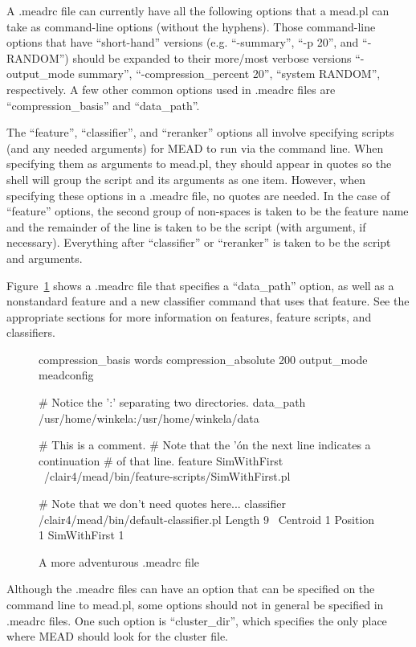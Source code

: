 \documentclass[10pt]{article}
\begin{document}
A .meadrc file can currently have all the following options that
a mead.pl can take as command-line options (without the hyphens).  
Those command-line options that have ``short-hand'' versions
(e.g. ``-summary'', ``-p 20'', and ``-RANDOM'') should be expanded to 
their more/most verbose versions ``-output\_mode summary'', 
``-compression\_percent 20'', ``system RANDOM'', respectively.
A few other common options used in .meadrc files are ``compression\_basis''
and ``data\_path''.

The ``feature'', ``classifier'', and ``reranker'' options all 
involve specifying scripts (and any needed arguments) for MEAD to
run via the command line.  When specifying them as arguments
to mead.pl, they should appear in quotes so the shell will group
the script and its arguments as one item.  However, when
specifying these options in a .meadrc file, no quotes are needed.
In the case of  ``feature'' options, the second group of
non-spaces is taken to be the feature name and the remainder of the
line is taken to be the script (with argument, if necessary).
Everything after ``classifier'' or ``reranker'' is taken to be
the script and arguments.

Figure~\ref{figure:meadrc2} shows a .meadrc file that specifies a
``data\_path'' option, as well as a nonstandard feature and a 
new classifier command that uses that feature.  See the
appropriate sections for more information on features, feature
scripts, and classifiers.  

\begin{figure}[htp!]
\centering
\begin{boxedverbatim}
compression_basis       words
compression_absolute    200
output_mode             meadconfig

# Notice the ':' separating two directories.
data_path               /usr/home/winkela:/usr/home/winkela/data

# This is a comment.
# Note that the '\' on the next line indicates a continuation
# of that line.
feature SimWithFirst \
   /clair4/mead/bin/feature-scripts/SimWithFirst.pl

# Note that we don't need quotes here...
classifier /clair4/mead/bin/default-classifier.pl Length 9 \
   Centroid 1 Position 1 SimWithFirst 1
\end{boxedverbatim}
\caption{A more adventurous .meadrc file}
\label{figure:meadrc2}
\end{figure}

Although the .meadrc files can have an option that can be specified
on the command line to mead.pl, some options should not in general
be specified in .meadrc files.  One such option is
``cluster\_dir'', which specifies the only place where MEAD
should look for the cluster file.
\end{document}

